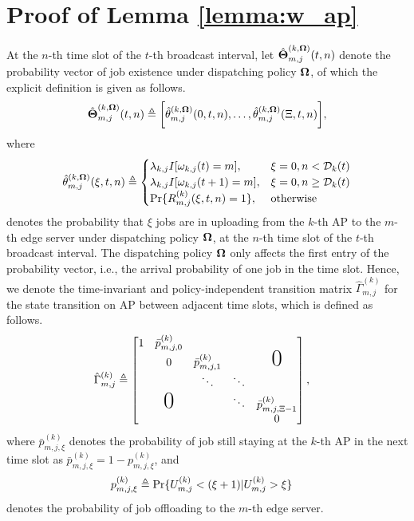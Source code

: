 \appendices
\section{ Proof of Lemma \ref{lemma:w_ap} }
\label{append_1}
At the $n$-th time slot of the $t$-th broadcast interval, let $\hat{\boldsymbol{\Theta}}^{(k,\boldsymbol{\Omega})}_{m,j}(t,n)$ denote the probability vector of job existence under dispatching policy $\boldsymbol{\Omega}$, of which the explicit definition is given as follows.
\begin{align}
    \hat{\boldsymbol{\Theta}}^{(k,\boldsymbol{\Omega})}_{m,j}(t,n) \triangleq \bigg[
        \hat{\theta}^{(k,\boldsymbol{\Omega})}_{m,j}(0,t,n),
        \dots,
        \hat{\theta}^{(k,\boldsymbol{\Omega})}_{m,j}(\Xi,t,n)
    \bigg],
\end{align}
where
{\small
\begin{align}
    \hat{\theta}^{(k,\boldsymbol{\Omega})}_{m,j}(\xi,t,n) \triangleq
    \begin{cases}
        \lambda_{k,j} I[\omega_{k,j}(t)=m], &\xi=0, n < \mathcal{D}_{k}(t)
        \\
        \lambda_{k,j} I[\omega_{k,j}(t+1)=m], &\xi=0, n \geq \mathcal{D}_{k}(t) 
        \\
        \Pr\{R^{(k)}_{m,j}(\xi,t,n)=1\}, & \text{otherwise}
    \end{cases}
\end{align}
}denotes the probability that $\xi$ jobs are in uploading from the $k$-th AP to the $m$-th edge server under dispatching policy $\boldsymbol{\Omega}$, at the $n$-th time slot of the $t$-th broadcast interval.
The dispatching policy $\boldsymbol{\Omega}$ only affects the first entry of the probability vector, i.e., the arrival probability of one job in the time slot.
Hence, we denote the time-invariant and policy-independent transition matrix $\hat{\Gamma}^{(k)}_{m,j}$ for the state transition on AP between adjacent time slots, which is defined as follows.
\begin{align}
    \hat{\Gamma}^{(k)}_{m,j} &\define
    \begin{bmatrix}
        1 & \bar{p}^{(k)}_{m,j,0} &                       &        &                           \\
          & 0                     & \bar{p}^{(k)}_{m,j,1} &        & \text{\huge0}             \\
          &                       & \ddots                & \ddots &                           \\
          & \text{\huge0}         &                       & \ddots & \bar{p}^{(k)}_{m,j,\Xi-1} \\
          &                       &                       &        & 0                         \\
    \end{bmatrix},
\end{align}
where $\bar{p}^{(k)}_{m,j,\xi}$ denotes the probability of job still staying at the $k$-th AP in the next time slot as $\bar{p}^{(k)}_{m,j,\xi} = 1 - p^{(k)}_{m,j,\xi}$, and
\begin{align}
    p^{(k)}_{m,j,\xi} &\triangleq \Pr\{U^{(k)}_{m,j} < (\xi+1) | U^{(k)}_{m,j}>\xi\}
\end{align}
denotes the probability of job offloading to the $m$-th edge server.

